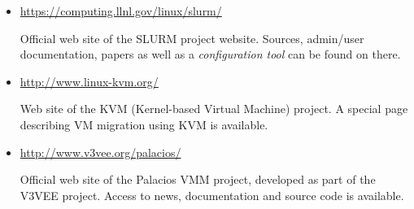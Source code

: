 \documentclass[10pt,authoryear]{sigplanconf} %
\begin{document}
\begin{itemize}
\item \url{https://computing.llnl.gov/linux/slurm/}

Official web site of the SLURM project website. Sources, admin/user documentation, papers as well as a \emph{configuration tool} can be found on there.

\item \url{http://www.linux-kvm.org/}

Web site of the KVM (Kernel-based Virtual Machine) project. A special page describing VM migration using KVM is available.

\item \url{http://www.v3vee.org/palacios/}

Official web site of the Palacios VMM project, developed as part of the V3VEE project. Access to news, documentation and source code is available.

\end{itemize}









\end{document}
